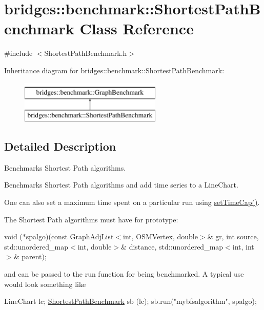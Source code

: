 \hypertarget{classbridges_1_1benchmark_1_1_shortest_path_benchmark}{}\section{bridges\+:\+:benchmark\+:\+:Shortest\+Path\+Benchmark Class Reference}
\label{classbridges_1_1benchmark_1_1_shortest_path_benchmark}


{\ttfamily \#include $<$Shortest\+Path\+Benchmark.\+h$>$}

Inheritance diagram for bridges\+:\+:benchmark\+:\+:Shortest\+Path\+Benchmark\+:\begin{figure}[H]
\begin{center}
\leavevmode
\includegraphics[height=2.000000cm]{classbridges_1_1benchmark_1_1_shortest_path_benchmark}
\end{center}
\end{figure}


\subsection{Detailed Description}
Benchmarks Shortest Path algorithms. 

Benchmarks Shortest Path algorithms and add time series to a Line\+Chart.

One can also set a maximum time spent on a particular run using \mbox{\hyperlink{classbridges_1_1benchmark_1_1_graph_benchmark_a56934eb2789e54c088e7b4423c3a7456}{set\+Time\+Cap()}}.

The Shortest Path algorithms must have for prototype\+:

void ($\ast$spalgo)(const Graph\+Adj\+List$<$int, O\+S\+M\+Vertex, double$>$\& gr, int source, std\+::unordered\+\_\+map$<$int, double$>$\& distance, std\+::unordered\+\_\+map$<$int, int$>$\& parent);

and can be passed to the run function for being benchmarked. A typical use would look something like


\begin{DoxyCode}
LineChart lc;
\mbox{\hyperlink{classbridges_1_1benchmark_1_1_shortest_path_benchmark_aa7109739d2ac254c113d820cff747df4}{ShortestPathBenchmark}} sb (lc);
sb.run(\textcolor{stringliteral}{"mybfsalgorithm"}, spalgo);
\end{DoxyCode}


